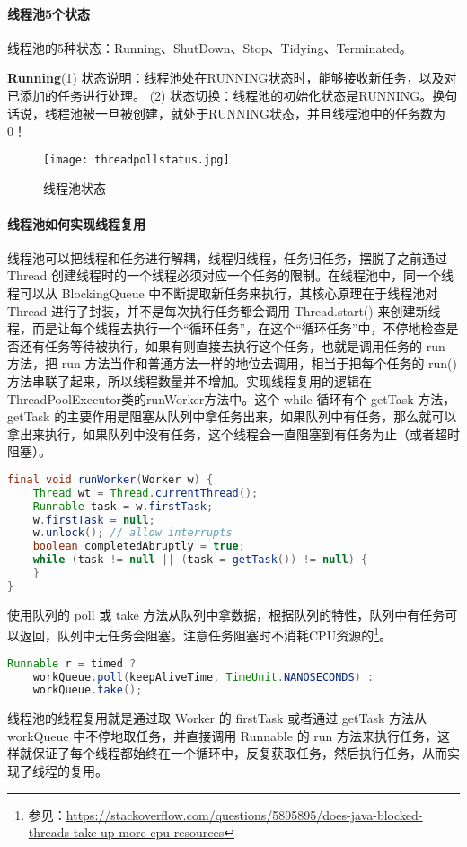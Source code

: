 \documentclass[../../../interview-questions.tex]{subfiles}
\begin{document}
\paragraph{线程池5个状态}

线程池的5种状态：Running、ShutDown、Stop、Tidying、Terminated。

\textbf{Running}(1) 状态说明：线程池处在RUNNING状态时，能够接收新任务，以及对已添加的任务进行处理。
(2) 状态切换：线程池的初始化状态是RUNNING。换句话说，线程池被一旦被创建，就处于RUNNING状态，并且线程池中的任务数为0！

\begin{figure}[htbp]
	\centering
	\texttt{[image: threadpollstatus.jpg]}
	\caption{线程池状态}
	\label{fig:threadpollstatus}
\end{figure}


\paragraph{线程池如何实现线程复用}

线程池可以把线程和任务进行解耦，线程归线程，任务归任务，摆脱了之前通过 Thread 创建线程时的一个线程必须对应一个任务的限制。在线程池中，同一个线程可以从 BlockingQueue 中不断提取新任务来执行，其核心原理在于线程池对 Thread 进行了封装，并不是每次执行任务都会调用 Thread.start() 来创建新线程，而是让每个线程去执行一个“循环任务”，在这个“循环任务”中，不停地检查是否还有任务等待被执行，如果有则直接去执行这个任务，也就是调用任务的 run 方法，把 run 方法当作和普通方法一样的地位去调用，相当于把每个任务的 run() 方法串联了起来，所以线程数量并不增加。实现线程复用的逻辑在ThreadPoolExecutor类的runWorker方法中。这个 while 循环有个 getTask 方法，getTask 的主要作用是阻塞从队列中拿任务出来，如果队列中有任务，那么就可以拿出来执行，如果队列中没有任务，这个线程会一直阻塞到有任务为止（或者超时阻塞）。

\begin{lstlisting}[language=Java]
final void runWorker(Worker w) {
    Thread wt = Thread.currentThread();
    Runnable task = w.firstTask;
    w.firstTask = null;
    w.unlock(); // allow interrupts
    boolean completedAbruptly = true;
    while (task != null || (task = getTask()) != null) {
    }
}
\end{lstlisting}

使用队列的 poll 或 take 方法从队列中拿数据，根据队列的特性，队列中有任务可以返回，队列中无任务会阻塞。注意任务阻塞时不消耗CPU资源的\footnote{参见：\url{https://stackoverflow.com/questions/5895895/does-java-blocked-threads-take-up-more-cpu-resources}}。

\begin{lstlisting}[language=Java]
Runnable r = timed ?
    workQueue.poll(keepAliveTime, TimeUnit.NANOSECONDS) :
    workQueue.take();
\end{lstlisting}
    

线程池的线程复用就是通过取 Worker 的 firstTask 或者通过 getTask 方法从 workQueue 中不停地取任务，并直接调用 Runnable 的 run 方法来执行任务，这样就保证了每个线程都始终在一个循环中，反复获取任务，然后执行任务，从而实现了线程的复用。
\end{document}
